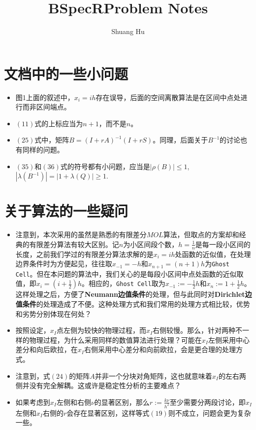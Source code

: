 \documentclass[UTF8]{ctexart}
\title{BSpecRProblem Notes}
\author{Shuang Hu}
\theoremstyle{plain}
\theoremstyle{definition}
\theoremstyle{remark}
\begin{document}
\maketitle
\section{文档中的一些小问题}
\begin{itemize}
    \item 图1上面的叙述中，$x_{i}=ih$存在误导，后面的空间离散算法是在区间中点处进行而非区间端点。
    \item $(11)$式的上标应当为$n+1$，而不是$n$。
    \item $(25)$式中，矩阵$B=(I+rA)^{-1}(I+rS)$。同理，后面关于$B^{-1}$的讨论也有同样的问题。
    \item $(35)$和$(36)$式的符号都有小问题，应当是$|\rho(B)|\le 1$, $|\lambda(B^{-1})|=|1+\lambda(Q)|\ge 1$.
\end{itemize}
\section{关于算法的一些疑问}
\begin{itemize}
    \item 注意到，本次采用的虽然是熟悉的有限差分$MOL$算法，但取点的方案却和经典的有限差分算法有较大区别。记$n$为小区间段个数，$h=\frac{1}{n}$是每一段小区间的长度，之前我们学过的有限差分算法求解的是$x_{i}=ih$处函数的近似值，在处理边界条件时为方便起见，往往取$x_{-1}=-h$和$x_{n+1}=(n+1)h$为\texttt{Ghost Cell}。但在本问题的算法中，我们关心的是每段小区间中点处函数的近似取值，即$x_{i}=(i+\frac{1}{2})h$。相应的，\texttt{Ghost Cell}取为$x_{-1}:=-\frac{1}{2}h$和$x_{n}:=1+\frac{1}{2}h$。这样处理之后，方便了\textbf{Neumann边值条件}的处理，但与此同时对\textbf{Dirichlet边值条件}的处理造成了不便。这种处理方式和我们常用的处理方式相比较，优势和劣势分别体现在何处？
    \item 按照设定，$x_{I}$点左侧为较快的物理过程，而$x_{I}$右侧较慢。那么，针对两种不一样的物理过程，为什么采用同样的数值算法进行处理？可能在$x_{I}$左侧采用中心差分和向后欧拉，在$x_{I}$右侧采用中心差分和向前欧拉，会是更合理的处理方式。
    \item 注意到，式$(24)$的矩阵$A$并非一个分块对角矩阵，这也就意味着$x_{I}$的左右两侧并没有完全解耦。这或许是稳定性分析的主要难点？
    \item 如果考虑到$x_{I}$左侧和右侧$\nu$的显著区别，那么$r:=\frac{k\nu}{h^2}$至少需要分两段讨论，即$x_{I}$左侧和$x_{I}$右侧的$r$会存在显著区别，这样等式$(19)$则不成立，问题会更为复杂一些。
\end{itemize}
\end{document}
